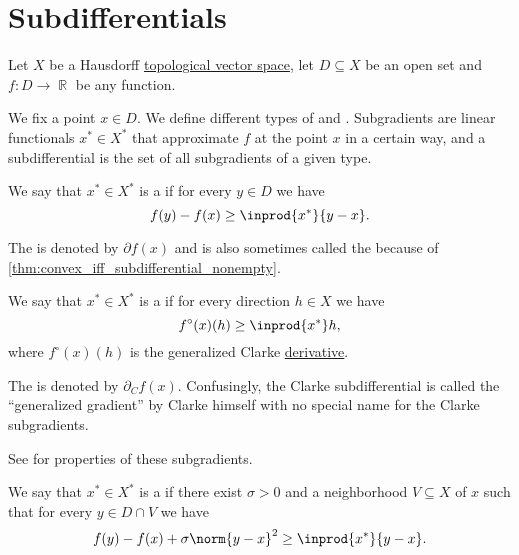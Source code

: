 \section{Subdifferentials}\label{sec:subdifferentials}

Let \( X \) be a Hausdorff \hyperref[def:topological_vector_space]{topological vector space}, let \( D \subseteq X \) be an open set and \( f: D \to \BbbR \) be any function.

\begin{definition}\label{def:subdifferentials}
  We fix a point \( x \in D \). We define different types of  and . Subgradients are linear functionals \( x^* \in X^* \) that approximate \( f \) at the point \( x \) in a certain way, and a subdifferential is the set of all subgradients of a given type.

  \begin{thmenum}
    We say that \( x^* \in X^* \) is a  if for every \( y \in D \) we have
    \begin{equation*}
      f(y) - f(x) \geq \inprod {x^*} {y - x}.
    \end{equation*}

    The  is denoted by \( \partial f(x) \) and is also sometimes called the  because of \cref{thm:convex_iff_subdifferential_nonempty}.

    We say that \( x^* \in X^* \) is a  if for every direction \( h \in X \) we have
    \begin{equation*}
      f^\circ(x)(h) \geq \inprod {x^*} h,
    \end{equation*}
    where \( f^\circ(x)(h) \) is the generalized Clarke \hyperref[def:nonsmooth_derivatives/clarke]{derivative}.

    The  is denoted by \( \partial_C f(x) \). Confusingly, the Clarke subdifferential is called the \enquote{generalized gradient} by Clarke himself with no special name for the Clarke subgradients.

    See  for properties of these subgradients.

    We say that \( x^* \in X^* \) is a  if there exist \( \sigma > 0 \) and a neighborhood \( V \subseteq X \) of \( x \) such that for every \( y \in D \cap V \) we have
    \begin{equation*}
      f(y) - f(x) + \sigma \norm{y - x}^2 \geq \inprod {x^*} {y - x}.
    \end{equation*}


\end{thmenum}
\end{definition}
